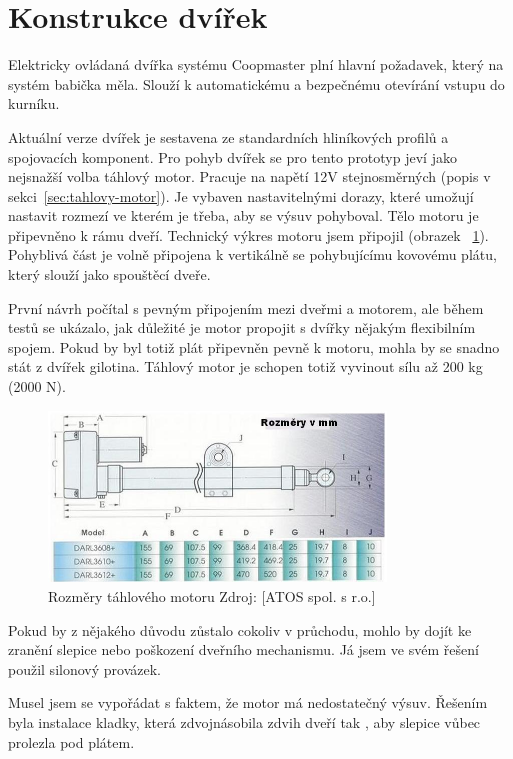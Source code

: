 \section{Konstrukce dvířek}\label{sec:konstrukce-dvirek}
Elektricky ovládaná dvířka systému Coopmaster plní hlavní požadavek, který na systém babička měla.
Slouží k automatickému a bezpečnému otevírání vstupu do kurníku.

Aktuální verze dvířek je sestavena ze standardních hliníkových profilů a spojovacích komponent.
Pro pohyb dvířek se pro tento prototyp jeví jako nejsnažší volba táhlový motor.
Pracuje na napětí 12V stejnosměrných (popis v sekci~\ref{sec:tahlovy-motor}).
Je vybaven nastavitelnými dorazy, které umožují nastavit rozmezí ve kterém je třeba, aby se výsuv pohyboval.
Tělo motoru je připevněno k rámu dveří.
Technický výkres motoru jsem připojil (obrazek ~\ref{fig:instalace_dvere_tahlovy_motor}).
Pohyblivá část je volně připojena k vertikálně se pohybujícímu kovovému plátu, který slouží jako spouštěcí dveře.

První návrh počítal s pevným připojením mezi dveřmi a motorem, ale během testů se ukázalo, jak důležité je motor propojit s dvířky nějakým flexibilním spojem.
Pokud by byl totiž plát připevněn pevně k motoru, mohla by se snadno stát z dvířek gilotina.
Táhlový motor je schopen totiž vyvinout sílu až 200 kg (2000 N).

\begin{figure}[H]
    \centering
    \includegraphics[width=0.8\textwidth]{img/instalace_dvere_tahlovy_motor}
    \caption{Rozměry táhlového motoru Zdroj: [ATOS spol. s r.o.]}
    \label{fig:instalace_dvere_tahlovy_motor}
\end{figure}

Pokud by z nějakého důvodu zůstalo cokoliv v průchodu, mohlo by dojít ke zranění slepice nebo poškození dveřního mechanismu.
Já jsem ve svém řešení použil silonový provázek.

Musel jsem se vypořádat s faktem, že motor má nedostatečný výsuv.
Řešením byla instalace kladky, která zdvojnásobila zdvih dveří tak , aby slepice vůbec prolezla pod plátem.

